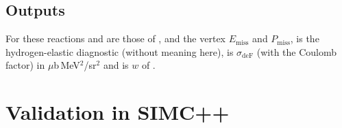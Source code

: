 \documentclass{simcnote}
\begin{document}
\subsection{Outputs}

For these reactions  and  are those of ,  and  the vertex
$E_\mathrm{miss}$ and $P_\mathrm{miss}$,  is the hydrogen-elastic diagnostic (without meaning here),
 is $\sigma_\mathrm{deF}$ (with the Coulomb factor) in $\mu$b\,MeV$^2$/sr$^2$ and  is $w$ of
.

\section{Validation in SIMC++}
\end{document}
